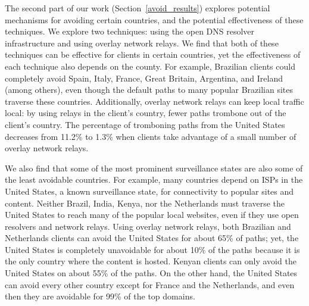 The second part of our work (Section~\ref{avoid_results}) explores
potential mechanisms for avoiding certain countries, and the potential
effectiveness of these techniques.  We explore two techniques: using the
open DNS resolver infrastructure and using overlay network relays.  We
find that both of these techniques can be effective for clients in
certain countries, yet the effectiveness of each technique also depends
on the county.  For example, Brazilian clients could completely avoid
Spain, Italy, France, Great Britain, Argentina, and Ireland (among
others), even though the default paths to many popular Brazilian sites
traverse these countries. Additionally, overlay network relays can keep
local traffic local: by using relays in the client's country, fewer
paths trombone out of the client's country.  The percentage of
tromboning paths from the United States decreases from 11.2\% to 1.3\%
when clients take advantage of a small number of overlay network relays.

We also find that some of the most prominent surveillance states are
also some of the least avoidable countries.  For example, many countries
depend on ISPs in the United States, a known surveillance state, for
connectivity to popular sites and content.  Neither Brazil, India, Kenya, nor
the Netherlands must traverse the United States to reach many of the
popular local websites, even if they use open resolvers and network
relays. Using overlay network relays, both Brazilian and Netherlands
clients can avoid the United States for about 65\% of paths; yet, the
United States is completely unavoidable for about 10\% of the paths
because it is the only country where the content is hosted.  Kenyan
clients can only avoid the United States on about 55\% of the paths.  On
the other hand, the United States can avoid every other country except
for France and the Netherlands, and even then they are avoidable for
99\% of the top domains.
